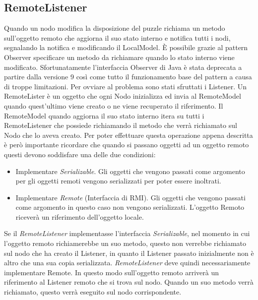 \subsection{RemoteListener}
Quando un nodo modifica la disposizione del puzzle richiama un metodo sull'oggetto remoto che aggiorna il suo stato interno e notifica tutti i nodi, segnalando la notifica e modificando il LocalModel.\newline
È possibile grazie al pattern Observer specificare un metodo da richiamare quando lo stato interno viene modificato.\newline
Sfortunatamente l'interfaccia Observer di Java è stata deprecata a partire dalla versione 9 così come tutto il funzionamento base del pattern a causa di troppe limitazioni.\newline
Per ovviare al problema sono stati sfruttati i Listener. Un RemoteLister è un oggetto che ogni Nodo inizializza ed invia al RemoteModel quando quest'ultimo viene creato o ne viene recuperato il riferimento. Il RemoteModel quando aggiorna il suo stato interno itera su tutti i RemoteListener che possiede richiamando il metodo che verrà richiamato sul Nodo che lo aveva creato.\newline
Per poter effettuare questa operazione appena descritta è però importante ricordare che quando si passano oggetti ad un oggetto remoto questi devono soddisfare una delle due condizioni:
\begin{itemize}
    \item Implementare \textit{Serializable}. Gli oggetti che vengono passati come argomento per gli oggetti remoti vengono serializzati per poter essere inoltrati.
    \item Implementare \textit{Remote} (Interfaccia di RMI). Gli oggetti che vengono passati come argomento in questo caso non vengono serializzati. L'oggetto Remoto riceverà un riferimento dell'oggetto locale.
\end{itemize}
Se il \textit{RemoteListener} implementasse l'interfaccia \textit{Serializable}, nel momento in cui l'oggetto remoto richiamerebbe un suo metodo, questo non verrebbe richiamato sul nodo che ha creato il Listener, in quanto il Listener passato inizialmente non è altro che una sua copia serializzata.\newline
\textit{RemoteListener} deve quindi necessariamente implementare Remote. In questo modo sull'oggetto remoto arriverà un riferimento al Listener remoto che si trova sul nodo. Quando un suo metodo verrà richiamato, questo verrà eseguito sul nodo corrispondente.
